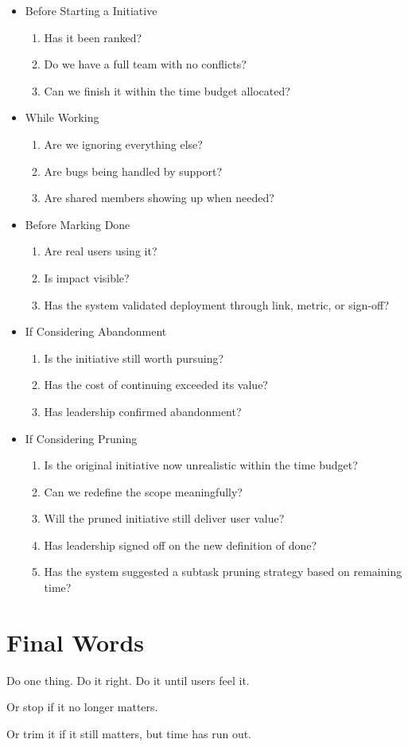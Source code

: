 \documentclass[a4paper]{article}
\begin{document}
\begin{itemize}
    \item Before Starting a Initiative
    \begin{enumerate}[label={$\square$}]
        \item Has it been ranked?
        \item Do we have a full team with no conflicts?
        \item Can we finish it within the time budget allocated?
    \end{enumerate}
    \item While Working
    \begin{enumerate}[label={$\square$}]
        \item Are we ignoring everything else?
        \item Are bugs being handled by support?
        \item Are shared members showing up when needed?
    \end{enumerate}
    \item Before Marking Done
    \begin{enumerate}[label={$\square$}]
        \item Are real users using it?
        \item Is impact visible?
        \item Has the system validated deployment through link, metric, or sign-off?
    \end{enumerate}
    \item If Considering Abandonment
    \begin{enumerate}[label={$\square$}]
        \item Is the initiative still worth pursuing?
        \item Has the cost of continuing exceeded its value?
        \item Has leadership confirmed abandonment?
    \end{enumerate}
    \item If Considering Pruning
    \begin{enumerate}[label={$\square$}]
        \item Is the original initiative now unrealistic within the time budget?
        \item Can we redefine the scope meaningfully?
        \item Will the pruned initiative still deliver user value?
        \item Has leadership signed off on the new definition of done?
        \item Has the system suggested a subtask pruning strategy based on remaining time?
    \end{enumerate}
\end{itemize}

\section{Final Words}

Do one thing. Do it right. Do it until users feel it.

Or stop if it no longer matters.

Or trim it if it still matters, but time has run out.
\end{document}

